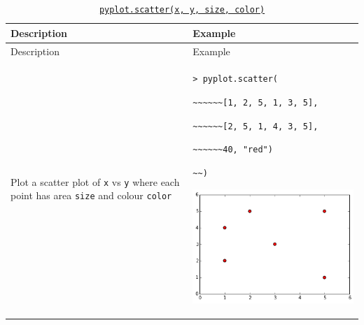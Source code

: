 \documentclass[10pt,a4paperpaper,]{article}
\begin{document}
\begin{longtable}[]{@{}ll@{}}
\caption{\href{http://matplotlib.org/api/pyplot_api.html\#matplotlib.pyplot.scatter}{\texttt{pyplot.scatter(x,\ y,\ size,\ color)}}}\tabularnewline
\toprule
\begin{minipage}[b]{0.47\columnwidth}\raggedright\strut
Description\strut
\end{minipage} & \begin{minipage}[b]{0.47\columnwidth}\raggedright\strut
Example\strut
\end{minipage}\tabularnewline
\midrule
\endfirsthead
\toprule
\begin{minipage}[b]{0.47\columnwidth}\raggedright\strut
Description\strut
\end{minipage} & \begin{minipage}[b]{0.47\columnwidth}\raggedright\strut
Example\strut
\end{minipage}\tabularnewline
\midrule
\endhead
\begin{minipage}[t]{0.47\columnwidth}\raggedright\strut
Plot a scatter plot of \texttt{x} vs \texttt{y} where each point has
area \texttt{size} and colour \texttt{color}\strut
\end{minipage} & \begin{minipage}[t]{0.47\columnwidth}\raggedright\strut
\texttt{\textgreater{}\ pyplot.scatter(}

\texttt{\textasciitilde{}\textasciitilde{}\textasciitilde{}\textasciitilde{}\textasciitilde{}\textasciitilde{}{[}1,\ 2,\ 5,\ 1,\ 3,\ 5{]},}

\texttt{\textasciitilde{}\textasciitilde{}\textasciitilde{}\textasciitilde{}\textasciitilde{}\textasciitilde{}{[}2,\ 5,\ 1,\ 4,\ 3,\ 5{]},}

\texttt{\textasciitilde{}\textasciitilde{}\textasciitilde{}\textasciitilde{}\textasciitilde{}\textasciitilde{}40,\ "red")}

\texttt{\textasciitilde{}\textasciitilde{})}

\includegraphics[width=\textwidth]{assets/03-scatter.png}\strut
\end{minipage}\tabularnewline
\bottomrule
\end{longtable}
\end{document}
